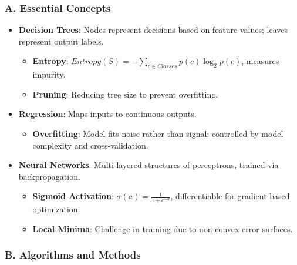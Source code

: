 \documentclass[
  12pt,
]{report}
\providecommand{\tightlist}{%
  \setlength{\itemsep}{0pt}\setlength{\parskip}{0pt}}
\begin{document}
\subsubsection{A. Essential Concepts}\label{a.-essential-concepts}

\begin{itemize}
\tightlist
\item
  \textbf{Decision Trees}: Nodes represent decisions based on feature values; leaves represent output labels.

  \begin{itemize}
  \tightlist
  \item
    \textbf{Entropy}: \(Entropy(S) = -\sum_{c \in Classes} p(c) \log_2 p(c)\), measures impurity.
  \item
    \textbf{Pruning}: Reducing tree size to prevent overfitting.
  \end{itemize}
\item
  \textbf{Regression}: Maps inputs to continuous outputs.

  \begin{itemize}
  \tightlist
  \item
    \textbf{Overfitting}: Model fits noise rather than signal; controlled by model complexity and cross-validation.
  \end{itemize}
\item
  \textbf{Neural Networks}: Multi-layered structures of perceptrons, trained via backpropagation.

  \begin{itemize}
  \tightlist
  \item
    \textbf{Sigmoid Activation}: \(\sigma(a) = \frac{1}{1 + e^{-a}}\), differentiable for gradient-based optimization.
  \item
    \textbf{Local Minima}: Challenge in training due to non-convex error surfaces.
  \end{itemize}
\end{itemize}

\subsubsection{B. Algorithms and Methods}\label{b.-algorithms-and-methods}
\end{document}
